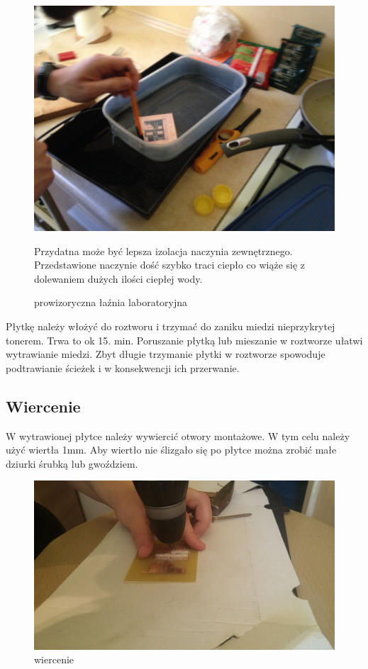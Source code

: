 \documentclass[a4paper,11pt]{article}
\def\SCALE{0.6}
\begin{document}
\begin{figure}[H]
	\centering
	\includegraphics[width=\SCALE
	\paperwidth]{wanienka}
	\caption{prowizoryczna łaźnia laboratoryjna}
Przydatna może być lepsza izolacja naczynia zewnętrznego. Przedstawione naczynie dość szybko traci ciepło co wiąże się z dolewaniem dużych ilości ciepłej wody.
\end{figure}


Płytkę należy włożyć do roztworu i trzymać do zaniku miedzi nieprzykrytej tonerem. Trwa to ok 15. min. Poruszanie płytką lub mieszanie w roztworze ułatwi wytrawianie miedzi. Zbyt długie trzymanie płytki w roztworze spowoduje podtrawianie ścieżek i w konsekwencji ich przerwanie.

\subsection{Wiercenie}
W wytrawionej płytce należy wywiercić otwory montażowe. W tym celu należy użyć wiertła 1mm. Aby wiertło nie ślizgało się po płytce można zrobić małe dziurki śrubką lub gwoździem.
	\begin{figure}[H]
		\centering
		\includegraphics[width=\SCALE
		\paperwidth]{wiercenie}
		\caption{wiercenie}
	\end{figure}	
\end{document}
